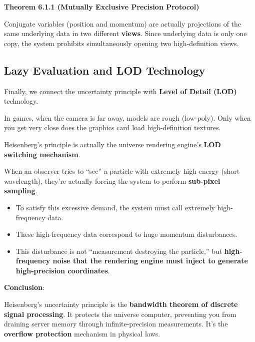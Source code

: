 \textbf{Theorem 6.1.1 (Mutually Exclusive Precision Protocol)}

Conjugate variables (position and momentum) are actually projections of the same underlying data in two different \textbf{views}. Since underlying data is only one copy, the system prohibits simultaneously opening two high-definition views.

\subsection{Lazy Evaluation and LOD Technology}

Finally, we connect the uncertainty principle with \textbf{Level of Detail (LOD)} technology.

In games, when the camera is far away, models are rough (low-poly). Only when you get very close does the graphics card load high-definition textures.

Heisenberg's principle is actually the universe rendering engine's \textbf{LOD switching mechanism}.

When an observer tries to ``see'' a particle with extremely high energy (short wavelength), they're actually forcing the system to perform \textbf{sub-pixel sampling}.
\begin{itemize}
\item To satisfy this excessive demand, the system must call extremely high-frequency data.
\item These high-frequency data correspond to huge momentum disturbances.
\item This disturbance is not ``measurement destroying the particle,'' but \textbf{high-frequency noise that the rendering engine must inject to generate high-precision coordinates}.
\end{itemize}

\textbf{Conclusion}:

Heisenberg's uncertainty principle is the \textbf{bandwidth theorem of discrete signal processing}. It protects the universe computer, preventing you from draining server memory through infinite-precision measurements. It's the \textbf{overflow protection} mechanism in physical laws.
